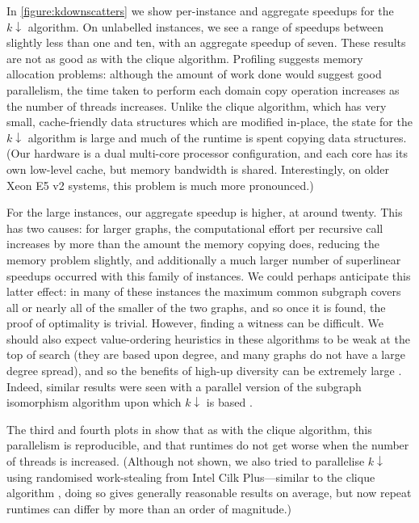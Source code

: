 \documentclass{llncs}
\begin{document}
In \cref{figure:kdownscatters} we show per-instance and aggregate speedups for the $k{\downarrow}$
algorithm. On unlabelled instances, we see a range of speedups between slightly less than one and
ten, with an aggregate speedup of seven. These results are not as good as with the clique algorithm.
Profiling suggests memory allocation problems: although the amount of work done would suggest good
parallelism, the time taken to perform each domain copy operation increases as the number of threads
increases. Unlike the clique algorithm, which has very small, cache-friendly data structures which
are modified in-place, the state for the $k{\downarrow}$ algorithm is large and much of the runtime
is spent copying data structures. (Our hardware is a dual multi-core processor configuration, and
each core has its own low-level cache, but memory bandwidth is shared. Interestingly, on older Xeon
E5 v2 systems, this problem is much more pronounced.)

For the large instances, our aggregate speedup is higher, at around twenty. This has two causes: for
larger graphs, the computational effort per recursive call increases by more than the amount the
memory copying does, reducing the memory problem slightly, and additionally a much larger
number of superlinear speedups occurred with this family of instances. We could perhaps anticipate
this latter effect: in many of these instances the maximum common subgraph covers all or nearly all
of the smaller of the two graphs, and so once it is found, the proof of optimality is trivial.
However, finding a witness can be difficult. We should also expect value-ordering heuristics in
these algorithms to be weak at the top of search (they are based upon degree, and many graphs do not
have a large degree spread), and so the benefits of high-up diversity can be extremely large
\cite{DBLP:conf/ijcai/HarveyG95,DBLP:conf/cp/ChuSS09,DBLP:journals/topc/McCreeshP15}. Indeed,
similar results were seen with a parallel version of the subgraph isomorphism algorithm upon which
$k{\downarrow}$ is based \cite{DBLP:conf/cp/McCreeshP15}.

The third and fourth plots in  show that as with the clique algorithm,
this parallelism is reproducible, and that runtimes do not get worse when the number of threads is
increased. (Although not shown, we also tried to parallelise $k{\downarrow}$ using randomised
work-stealing from Intel Cilk Plus---similar to the clique algorithm
\cite{DBLP:journals/topc/McCreeshP15}, doing so gives generally reasonable results on average, but
now repeat runtimes can differ by more than an order of magnitude.)
\end{document}
